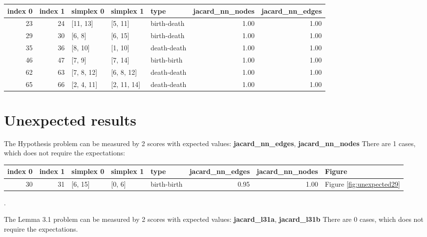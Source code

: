\documentclass{article}
\begin{document}
\begin{center}
\begin{tabular}{rrlllrr}
\toprule
index 0 & index 1 & simplex 0 & simplex 1 & type & jacard\_nn\_nodes & jacard\_nn\_edges \\
\midrule
23 & 24 & [11, 13] & [5, 11] & birth-death & 1.00 & 1.00 \\
29 & 30 & [6, 8] & [6, 15] & birth-death & 1.00 & 1.00 \\
35 & 36 & [8, 10] & [1, 10] & death-death & 1.00 & 1.00 \\
46 & 47 & [7, 9] & [7, 14] & birth-birth & 1.00 & 1.00 \\
62 & 63 & [7, 8, 12] & [6, 8, 12] & death-death & 1.00 & 1.00 \\
65 & 66 & [2, 4, 11] & [2, 11, 14] & death-death & 1.00 & 1.00 \\
\bottomrule
\end{tabular}
\end{center}


\section{Unexpected results}

    \par The Hypothesis problem can be measured by 2 scores with expected 
    values: \textbf{jacard\_nn\_edges}, \textbf{jacard\_nn\_nodes}
    There are 1 cases, which does not require the expectations: 
\begin{center}
\begin{tabular}{rrlllrrl}
\toprule
index 0 & index 1 & simplex 0 & simplex 1 & type & jacard\_nn\_edges & jacard\_nn\_nodes & Figure \\
\midrule
30 & 31 & [6, 15] & [0, 6] & birth-birth & 0.95 & 1.00 & Figure \ref{fig:unexpected29} \\
\bottomrule
\end{tabular}
\end{center}.
    
    \par The Lemma 3.1 problem can be measured by 2 scores with expected 
    values: \textbf{jacard\_l31a}, \textbf{jacard\_l31b}
    There are 0 cases, which does not require the expectations. 
    
\end{document}
